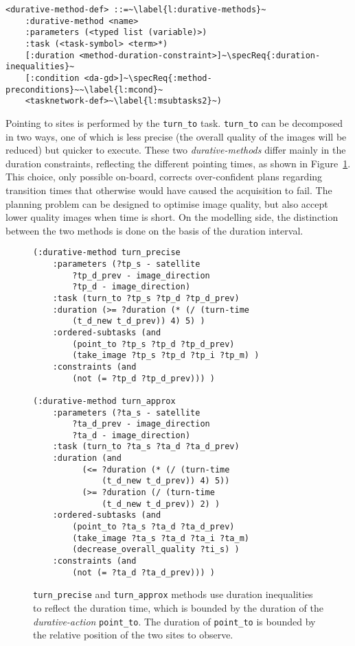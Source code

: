 \documentclass[letterpaper]{article} %
\begin{document}
\begin{lstlisting}[firstnumber=last, escapechar=~]
<durative-method-def> ::=~\label{l:durative-methods}~
    :durative-method <name>
    :parameters (<typed list (variable)>)
    :task (<task-symbol> <term>*)
    [:duration <method-duration-constraint>]~\specReq{:duration-inequalities}~
    [:condition <da-gd>]~\specReq{:method-preconditions}~~\label{l:mcond}~
    <tasknetwork-def>~\label{l:msubtasks2}~)
\end{lstlisting}



Pointing to sites is performed by the \texttt{turn\_to} task. \texttt{turn\_to} can be decomposed in two ways, one of which is less precise (the overall quality of the images will be reduced) but quicker to execute. These two \emph{durative-methods} differ mainly in the duration constraints, reflecting the different pointing times, as shown in Figure~\ref{pddl_durative_m}. This choice, only possible on-board, corrects over-confident plans regarding transition times that otherwise would have caused the acquisition to fail. The planning problem can be designed to optimise image quality, but also accept lower quality images when time is short. On the modelling side, the distinction between the two methods is done
on the basis of the duration interval.
%
\begin{figure}[!h]
\begin{lstlisting}[language=pddl]
(:durative-method turn_precise
	:parameters (?tp_s - satellite
	    ?tp_d_prev - image_direction
	    ?tp_d - image_direction)
	:task (turn_to ?tp_s ?tp_d ?tp_d_prev)
	:duration (>= ?duration (* (/ (turn-time
	    (t_d_new t_d_prev)) 4) 5) )
	:ordered-subtasks (and
		(point_to ?tp_s ?tp_d ?tp_d_prev)
		(take_image ?tp_s ?tp_d ?tp_i ?tp_m) )
	:constraints (and
		(not (= ?tp_d ?tp_d_prev))) )

(:durative-method turn_approx
	:parameters (?ta_s - satellite
	    ?ta_d_prev - image_direction
	    ?ta_d - image_direction)
	:task (turn_to ?ta_s ?ta_d ?ta_d_prev)
	:duration (and
		  (<= ?duration (* (/ (turn-time
		      (t_d_new t_d_prev)) 4) 5))
		  (>= ?duration (/ (turn-time
		      (t_d_new t_d_prev)) 2) )
	:ordered-subtasks (and
		(point_to ?ta_s ?ta_d ?ta_d_prev)
		(take_image ?ta_s ?ta_d ?ta_i ?ta_m)
		(decrease_overall_quality ?ti_s) )
	:constraints (and
		(not (= ?ta_d ?ta_d_prev))) )
\end{lstlisting}
\caption{\texttt{turn\_precise} and \texttt{turn\_approx} methods use duration inequalities to reflect the duration time, which is bounded by the duration of the \emph{durative-action} \texttt{point\_to}. The duration of \texttt{point\_to} is bounded by the relative position of the two sites to observe.\label{pddl_durative_m}}
\end{figure}
\end{document}
